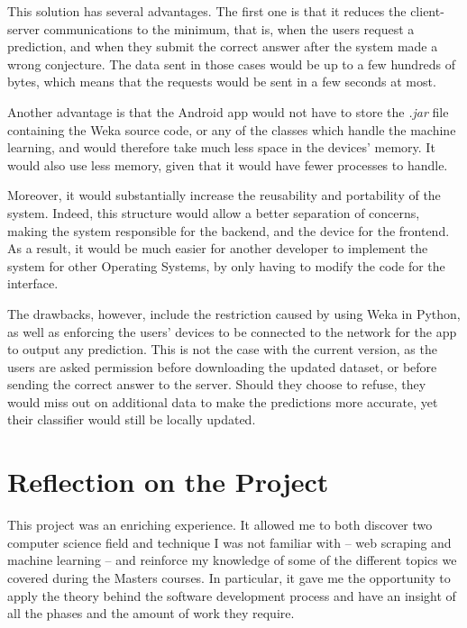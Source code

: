 \documentclass{mproj}
\begin{document}
This solution has several advantages. The first one is that it reduces the client-server communications to the minimum, that is, when the users request a prediction, and when they submit the correct answer after the system made a wrong conjecture. The data sent in those cases would be up to a few hundreds of bytes, which means that the requests would be sent in a few seconds at most. \par

Another advantage is that the Android app would not have to store the \textit{.jar} file containing the Weka source code, or any of the classes which handle the machine learning, and would therefore take much less space in the devices' memory. It would also use less memory, given that it would have fewer processes to handle. \par

Moreover, it would substantially increase the reusability and portability of the system. Indeed, this structure would allow a better separation of concerns, making the system responsible for the backend, and the device for the frontend. As a result, it would be much easier for another developer to implement the system for other Operating Systems, by only having to modify the code for the interface. \par

The drawbacks, however, include the restriction caused by using Weka in Python, as well as enforcing the users' devices to be connected to the network for the app to output any prediction. This is not the case with the current version, as the users are asked permission before downloading the updated dataset, or before sending the correct answer to the server. Should they choose to refuse, they would miss out on additional data to make the predictions more accurate, yet their classifier would still be locally updated.

\section{Reflection on the Project}

This project was an enriching experience. It allowed me to both discover two computer science field and technique I was not familiar with -- web scraping and machine learning -- and reinforce my knowledge of some of the different topics we covered during the Masters courses. In particular, it gave me the opportunity to apply the theory behind the software development process and have an insight of all the phases and the amount of work they require.
\end{document}
